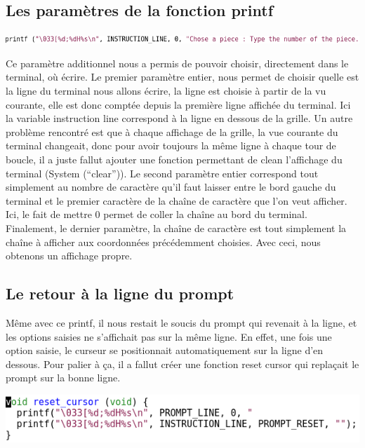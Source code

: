 \documentclass{article}
\begin{document}
\subsection {Les paramètres de la fonction printf}

\begin{flushleft}
\includegraphics[scale=0.45]{printf_capture.png}
\end{flushleft}

Ce paramètre additionnel nous a permis de pouvoir choisir, directement dans le terminal, où écrire. Le premier paramètre entier, nous permet de choisir quelle est la ligne du terminal nous allons écrire, la ligne est choisie à partir de la vu courante, elle est donc comptée depuis la première ligne affichée du terminal. Ici la variable instruction line correspond à la ligne en dessous de la grille. Un autre problème rencontré est que à chaque affichage de la grille, la vue courante du terminal changeait, donc pour avoir toujours la même ligne à chaque tour de boucle, il a juste fallut ajouter une fonction permettant de clean l'affichage du terminal (System (``clear'')).
Le second paramètre entier correspond tout simplement au nombre de caractère qu'il faut laisser entre le bord gauche du terminal et le premier caractère de la chaîne de caractère que l'on veut afficher. Ici, le fait de mettre 0 permet de coller la chaîne au bord du terminal.
Finalement, le dernier paramètre, la chaîne de caractère est tout simplement la chaîne à afficher aux coordonnées précédemment choisies. Avec ceci, nous obtenons un affichage propre.

\subsection {Le retour à la ligne du prompt}
Même avec ce printf, il nous restait le soucis du prompt qui revenait à la ligne, et les options saisies ne s'affichait pas sur la même ligne. En effet, une fois une option saisie, le curseur se positionnait automatiquement sur la ligne d'en dessous. Pour palier à ça, il a fallut créer une fonction reset cursor qui replaçait le prompt sur la bonne ligne.

\begin{flushleft}
\includegraphics[scale=0.45]{reset_cursor.png}
\end{flushleft}
\end{document}
